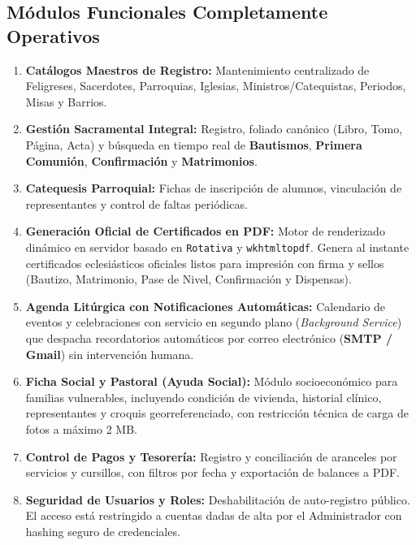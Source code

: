 \documentclass[11pt,a4paper]{article}
\begin{document}
\subsection{Módulos Funcionales Completamente Operativos}
\begin{enumerate}[leftmargin=1.2cm]
    \item \textbf{Catálogos Maestros de Registro:} Mantenimiento centralizado de Feligreses, Sacerdotes, Parroquias, Iglesias, Ministros/Catequistas, Periodos, Misas y Barrios.
    \item \textbf{Gestión Sacramental Integral:} Registro, foliado canónico (Libro, Tomo, Página, Acta) y búsqueda en tiempo real de \textbf{Bautismos}, \textbf{Primera Comunión}, \textbf{Confirmación} y \textbf{Matrimonios}.
    \item \textbf{Catequesis Parroquial:} Fichas de inscripción de alumnos, vinculación de representantes y control de faltas periódicas.
    \item \textbf{Generación Oficial de Certificados en PDF:} Motor de renderizado dinámico en servidor basado en \texttt{Rotativa} y \texttt{wkhtmltopdf}. Genera al instante certificados eclesiásticos oficiales listos para impresión con firma y sellos (Bautizo, Matrimonio, Pase de Nivel, Confirmación y Dispensas).
    \item \textbf{Agenda Litúrgica con Notificaciones Automáticas:} Calendario de eventos y celebraciones con servicio en segundo plano (\textit{Background Service}) que despacha recordatorios automáticos por correo electrónico (\textbf{SMTP / Gmail}) sin intervención humana.
    \item \textbf{Ficha Social y Pastoral (Ayuda Social):} Módulo socioeconómico para familias vulnerables, incluyendo condición de vivienda, historial clínico, representantes y croquis georreferenciado, con restricción técnica de carga de fotos a máximo 2 MB.
    \item \textbf{Control de Pagos y Tesorería:} Registro y conciliación de aranceles por servicios y cursillos, con filtros por fecha y exportación de balances a PDF.
    \item \textbf{Seguridad de Usuarios y Roles:} Deshabilitación de auto-registro público. El acceso está restringido a cuentas dadas de alta por el Administrador con hashing seguro de credenciales.
\end{enumerate}
\end{document}
